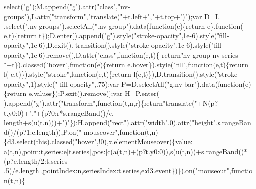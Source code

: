 \begin{DoxyCode}
      select(\textcolor{stringliteral}{"g"});M.append(\textcolor{stringliteral}{"g"}).attr(\textcolor{stringliteral}{"class"},\textcolor{stringliteral}{"nv-groups"}),L.attr(\textcolor{stringliteral}{"transform"},\textcolor{stringliteral}{"translate("}+t.left+\textcolor{stringliteral}{","}+t.top+\textcolor{stringliteral}{")"});var D=L
      .select(\textcolor{stringliteral}{".nv-groups"}).selectAll(\textcolor{stringliteral}{".nv-group"}).data(\textcolor{keyword}{function}(e)\{\textcolor{keywordflow}{return} e\},\textcolor{keyword}{function}(
      e,t)\{\textcolor{keywordflow}{return} t\});D.enter().append(\textcolor{stringliteral}{"g"}).style(\textcolor{stringliteral}{"stroke-opacity"},1e-6).style(\textcolor{stringliteral}{"fill-opacity"},1e-6),D.exit().
      transition().style(\textcolor{stringliteral}{"stroke-opacity"},1e-6).style(\textcolor{stringliteral}{"fill-opacity"},1e-6).remove(),D.attr(\textcolor{stringliteral}{"class"},\textcolor{keyword}{function}(e,t)\{\textcolor{keywordflow}{
      return}\textcolor{stringliteral}{"nv-group nv-series-"}+t\}).classed(\textcolor{stringliteral}{"hover"},\textcolor{keyword}{function}(e)\{\textcolor{keywordflow}{return} e.hover\}).style(\textcolor{stringliteral}{"fill"},\textcolor{keyword}{function}(e,t)\{\textcolor{keywordflow}{return} l(
      e,t)\}).style(\textcolor{stringliteral}{"stroke"},\textcolor{keyword}{function}(e,t)\{\textcolor{keywordflow}{return} l(e,t)\}),D.transition().style(\textcolor{stringliteral}{"stroke-opacity"},1).style(\textcolor{stringliteral}{"
      fill-opacity"},.75);var P=D.selectAll(\textcolor{stringliteral}{"g.nv-bar"}).data(\textcolor{keyword}{function}(e)\{\textcolor{keywordflow}{return} e.values\});P.exit().remove();var H=P.enter(
      ).append(\textcolor{stringliteral}{"g"}).attr(\textcolor{stringliteral}{"transform"},\textcolor{keyword}{function}(t,n,r)\{\textcolor{keywordflow}{return}\textcolor{stringliteral}{"translate("}+N(p?t.y0:0)+\textcolor{stringliteral}{","}+(p?0:r*s.rangeBand()/e.
      length+s(u(t,n)))+\textcolor{stringliteral}{")"}\});H.append(\textcolor{stringliteral}{"rect"}).attr(\textcolor{stringliteral}{"width"},0).attr(\textcolor{stringliteral}{"height"},s.rangeBand()/(p?1:e.length)),P.on(\textcolor{stringliteral}{"
      mouseover"},\textcolor{keyword}{function}(t,n)\{d3.select(\textcolor{keyword}{this}).classed(\textcolor{stringliteral}{"hover"},!0),x.elementMouseover(\{value:
      a(t,n),point:t,series:e[t.series],pos:[o(a(t,n)+(p?t.y0:0)),s(u(t,n))+s.rangeBand()*(p?e.length/2:t.series+
      .5)/e.length],pointIndex:n,seriesIndex:t.series,e:d3.event\})\}).on(\textcolor{stringliteral}{"mouseout"},\textcolor{keyword}{function}(t,n)\{

\end{DoxyCode}
